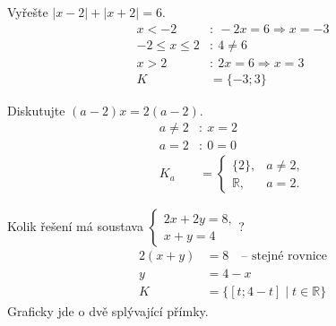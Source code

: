 \documentclass[11pt,a4paper]{article}
\begin{document}
\begin{zadaniReseniBox}[title={Samostatná práce 2}]
Vyřešte $|x-2|+|x+2|=6$.
\tcblower
\[\begin{aligned}
x<-2&:\ -2x=6\Rightarrow x=-3 \\
-2\le x\le2&:\ 4\ne6 \\
x>2&:\ 2x=6\Rightarrow x=3 \\
K&=\{-3;3\}
\end{aligned}\]

\end{zadaniReseniBox}
\begin{zadaniReseniBox}[title={Samostatná práce 3}]
Diskutujte $(a-2)x=2(a-2)$.
\tcblower
\[\begin{aligned}
a\ne2&:\ x=2 \\
a=2&:\ 0=0 \\
K_a&=\begin{cases}\{2\},&a\ne2,\\\mathbb R,&a=2.\end{cases}
\end{aligned}\]

\end{zadaniReseniBox}
\begin{zadaniReseniBox}[title={Rozšíření 1}]
Kolik řešení má soustava $\begin{cases}2x+2y=8,\\x+y=4\end{cases}$?
\tcblower
\[\begin{aligned}
2(x+y)&=8\quad\text{-- stejné rovnice} \\
y&=4-x \\
K&=\{[t;4-t]\mid t\in\mathbb R\}
\end{aligned}\]
Graficky jde o dvě splývající přímky.
\end{zadaniReseniBox}
\end{document}
